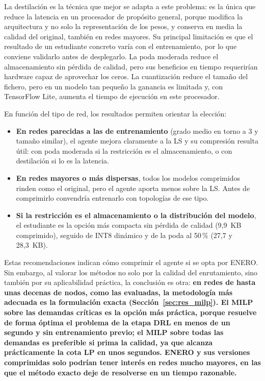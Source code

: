 La destilación es la técnica que mejor se adapta a este problema: es la única que reduce la latencia en un procesador de propósito general, porque modifica la arquitectura y no solo la representación de los pesos, y conserva en media la calidad del original, también en redes mayores. Su principal limitación es que el resultado de un estudiante concreto varía con el entrenamiento, por lo que conviene validarlo antes de desplegarlo. La poda moderada reduce el almacenamiento sin pérdida de calidad, pero sus beneficios en tiempo requerirían hardware capaz de aprovechar los ceros. La cuantización reduce el tamaño del fichero, pero en un modelo tan pequeño la ganancia es limitada y, con TensorFlow Lite, aumenta el tiempo de ejecución en este procesador.

En función del tipo de red, los resultados permiten orientar la elección:
\begin{itemize}
	\item \textbf{En redes parecidas a las de entrenamiento} (grado medio en torno a 3 y tamaño similar), el agente mejora claramente a la LS y su compresión resulta útil: con poda moderada si la restricción es el almacenamiento, o con destilación si lo es la latencia.
	\item \textbf{En redes mayores o más dispersas}, todos los modelos comprimidos rinden como el original, pero el agente aporta menos sobre la LS. Antes de comprimirlo convendría entrenarlo con topologías de ese tipo.
	\item \textbf{Si la restricción es el almacenamiento o la distribución del modelo}, el estudiante es la opción más compacta sin pérdida de calidad (9,9~KB comprimido), seguido de INT8 dinámico y de la poda al 50\,\% (27,7 y 28,3~KB).
\end{itemize}

Estas recomendaciones indican cómo comprimir el agente si se opta por ENERO. Sin embargo, al valorar los métodos no solo por la calidad del enrutamiento, sino también por su aplicabilidad práctica, la conclusión es otra: \textbf{en redes de hasta unas decenas de nodos, como las evaluadas, la metodología más adecuada es la formulación exacta (Sección~\ref{sec:res_milp}). El MILP sobre las demandas críticas es la opción más práctica, porque resuelve de forma óptima el problema de la etapa DRL en menos de un segundo y sin entrenamiento previo; el MILP sobre todas las demandas es preferible si prima la calidad, ya que alcanza prácticamente la cota LP en unos segundos. ENERO y sus versiones comprimidas solo podrían tener interés en redes mucho mayores, en las que el método exacto deje de resolverse en un tiempo razonable.}
